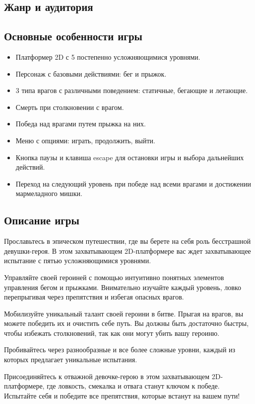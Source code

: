 \documentclass[article,12pt, fleqn]{article}
\begin{document}
\begin{itemize}
\subsection{Жанр и аудитория}

\subsection{Основные особенности игры}
\begin{itemize}
    \item  Платформер 2D с 5 постепенно усложняющимися уровнями.
    \item Персонаж с базовыми действиями: бег и прыжок.
    \item 3 типа врагов с различными поведением: статичные, бегающие и летающие.
    \item Смерть при столкновении с врагом.
    \item Победа над врагами путем прыжка на них.
    \item Меню с опциями: играть, продолжить, выйти.
    \item Кнопка паузы и клавиша escape для остановки игры и выбора дальнейших действий.
    \item Переход на следующий уровень при победе над всеми врагами и достижении мармеладного мишки.
\end{itemize}

\subsection{Описание игры}
Прославьтесь в эпическом путешествии, где вы берете на себя роль бесстрашной девушки-героя. В этом захватывающем 2D-платформере вас ждет захватывающее испытание с пятью усложняющимися уровнями.\par
Управляйте своей героиней с помощью интуитивно понятных элементов управления бегом и прыжками. Внимательно изучайте каждый уровень, ловко перепрыгивая через препятствия и избегая опасных врагов. \par
Мобилизуйте уникальный талант своей героини в битве. Прыгая на врагов, вы можете победить их и очистить себе путь. Вы должны быть достаточно быстры, чтобы избежать столкновений, так как они могут убить вашу героиню.\par
Пробивайтесь через разнообразные и все более сложные уровни, каждый из которых предлагает уникальные испытания. \par
Присоединяйтесь к отважной девочке-герою в этом захватывающем 2D-платформере, где ловкость, смекалка и отвага станут ключом к победе. Испытайте себя и победите все препятствия, которые встанут на вашем пути!


\end{itemize}
\end{document}
